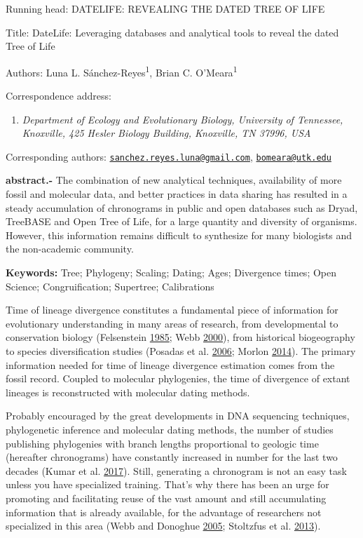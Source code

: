 \documentclass[]{article}
\title{}
\author{}
\date{}
\providecommand{\tightlist}{%
  \setlength{\itemsep}{0pt}\setlength{\parskip}{0pt}}
\begin{document}
Running head: DATELIFE: REVEALING THE DATED TREE OF LIFE

Title: DateLife: Leveraging databases and analytical tools to reveal the dated Tree of Life

Authors: Luna L. Sánchez-Reyes\textsuperscript{1}, Brian C. O'Meara\textsuperscript{1}

Correspondence address:

\begin{enumerate}
\def\labelenumi{\arabic{enumi}.}
\tightlist
\item
  \emph{Department of Ecology and Evolutionary Biology, University of Tennessee, Knoxville, 425 Hesler Biology Building, Knoxville, TN 37996, USA}
\end{enumerate}

Corresponding authors: \href{mailto:sanchez.reyes.luna@gmail.com}{\nolinkurl{sanchez.reyes.luna@gmail.com}}, \href{mailto:bomeara@utk.edu}{\nolinkurl{bomeara@utk.edu}}

\newpage

\textbf{abstract.-}
The combination of new analytical techniques, availability of more fossil and molecular
data, and better practices in data sharing has resulted in a steady accumulation
of chronograms in public and open databases such as Dryad, TreeBASE and Open Tree
of Life, for a large quantity and diversity of organisms. However, this information
remains difficult to synthesize for many biologists and the non-academic community.

\textbf{Keywords:} Tree; Phylogeny; Scaling; Dating; Ages; Divergence times; Open Science; Congruification; Supertree; Calibrations

\newpage

Time of lineage divergence constitutes a fundamental piece of information for evolutionary
understanding in many areas of research, from developmental to conservation biology (Felsenstein \protect\hyperlink{ref-Felsenstein1985a}{1985}; Webb \protect\hyperlink{ref-Webb2000}{2000}), from historical biogeography to species diversification studies (Posadas et al. \protect\hyperlink{ref-posadas2006historical}{2006}; Morlon \protect\hyperlink{ref-Morlon2014}{2014}). The primary information needed for time of lineage divergence estimation comes from the fossil record. Coupled to molecular phylogenies, the time of divergence of extant lineages is reconstructed with molecular dating methods.

Probably encouraged by the great developments in DNA sequencing techniques, phylogenetic inference and molecular dating methods, the number of studies publishing phylogenies with branch lengths proportional to geologic time (hereafter chronograms) have constantly increased in number for the last two decades (Kumar et al. \protect\hyperlink{ref-Kumar2017}{2017}).
Still, generating a chronogram is not an easy task unless you have specialized training. That's why there has been an urge for promoting and facilitating reuse of the vast amount and still accumulating information that is already available, for the advantage of researchers not specialized in this area (Webb and Donoghue \protect\hyperlink{ref-webb2005phylomatic}{2005}; Stoltzfus et al. \protect\hyperlink{ref-Stoltzfus2013}{2013}).
\end{document}
